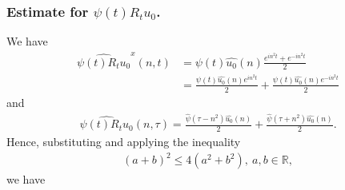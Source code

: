 \documentclass[12pt,reqno]{amsart}
\numberwithin{equation}{section}  %
\numberwithin{figure}{section}
\newcommand{\rr}{\mathbb{R}}
\newcommand{\wh}{\widehat}
\theoremstyle{plain}
\theoremstyle{definition}
\theoremstyle{remark}
\begin{document}
\subsubsection{Estimate for $\psi(t) R_{t}u_{0}$.} 
\label{sssec:est-init-term-1}
We have
%
%
\begin{equation*}
  \begin{split}
    \wh{\psi(t)R_{t}u_{0}}^{x}(n, t)
    & = \psi(t) \wh{u_{0}}(n) \frac{e^{in^2 t} + e^{-in^{2}t}}{2}
    \\
    & = \frac{\psi(t) \wh{u_{0}}(n)e^{in^{2}t}}{2} + \frac{\psi(t)
    \wh{u_{0}}(n)e^{-in^{2}t}}{2}  
  \end{split}
\end{equation*}
%
%
and
%
%
\begin{equation*}
  \begin{split}
    \wh{\psi(t) R_{t}u_{0}}(n, \tau) = \frac{\wh{\psi}(\tau -
    n^{2})\wh{u_{0}}(n)}{2} + \frac{\wh{\psi}(\tau + n^{2})\wh{u_{0}}(n)}{2}.
  \end{split}
\end{equation*}
%
%
Hence, substituting and applying the inequality 
%
%
\begin{equation}
  \label{square-ineq}
\begin{split}
(a + b)^{2} \le 4(a^{2} +
b^{2}),\ a, b \in \rr,
\end{split}
\end{equation}
%
%
we have
\end{document}
